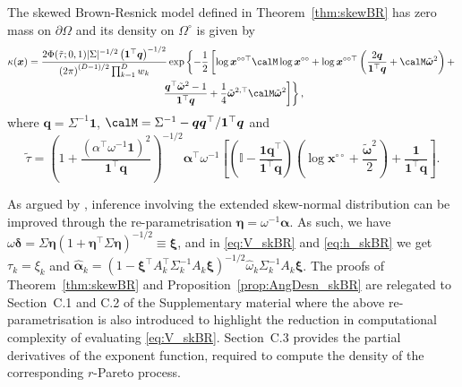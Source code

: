\documentclass[12pt]{article}
\begin{document}
\begin{proposition}
\label{prop:AngDesn_skBR}
The skewed Brown-Resnick model defined in Theorem~\ref{thm:skewBR} has zero mass on $\partial\Omega$ and its density on $\Omega^\circ$ is given by
%
\begin{multline}
\label{eq:h_skBR}
\kappa(\bm x) =\frac{2\Phi(\tilde{\tau};0,1)| \Sigma |^{-1/2} \left( \bm 1^\top \bm q\right)^{-1/2}}{\left( 2\pi \right)^{(D-1)/2}\prod_{k=1}^D w_k}\exp \left\{ -\frac{1}{2} \left[ \log \bm x^{\circ\circ\top} \calM \log \bm x^{\circ\circ} + \log \bm x^{\circ\circ\top} \left( \frac{2 \bm q}{\bm 1^\top \bm q} + \calM\tilde{\bm\omega}^2\right) + \right.\right. \\ 
\left.\left. \frac{\bm q^\top\tilde{\bm \omega}^2 - 1}{\bm 1 ^\top \bm q} + \frac{1}{4}\tilde{\bm\omega}^{2,\top}\calM\tilde{\bm\omega}^2 \right]\right\},
\end{multline}%
where $\bm q = \Sigma^{-1} \bm 1$, $\calM = \Sigma^{-1} - \bm q \bm q^\top / \bm 1^\top \bm q$ and  
$$\tilde{\tau}=\left(1 + \frac{\left(\alpha^\top\omega^{-1}\bm 1\right)^2}{\bm 1^\top \bm q} \right)^{-1/2} \bm\alpha^\top\omega^{-1}\left[\left(\mathbb{I} - \frac{\bm 1\bm q^\top}{\bm 1^\top \bm q}\right)\left(\log \bm x^{\circ\circ} + \frac{\tilde{\bm\omega}^2}{2}\right) +  \frac{\bm 1}{\bm 1^\top\bm q}  \right].$$
\end{proposition}

As argued by \citet[][Section~5.2]{Azzalini:2013}, inference involving the extended skew-normal distribution can be improved through the re-parametrisation $\bm \eta = \omega^{-1} \bm \alpha$. As such, we have $\omega \bm \delta = \Sigma \bm \eta \left( 1+\bm \eta^\top \Sigma \bm \eta\right)^{-1/2} \equiv \bm \xi$, and in \eqref{eq:V_skBR} and \eqref{eq:h_skBR} we get $\tau_k = \xi_k$ and $\hat{\bm\alpha}_k = \left(1-\bm\xi^\top A_k^\top\Sigma_k^{-1} A_k \bm\xi \right)^{-1/2} \hat{ \omega}_k\Sigma_k^{-1}A_k \bm\xi$. The proofs of Theorem~\ref{thm:skewBR} and Proposition~\ref{prop:AngDesn_skBR} are relegated to Section~C.1 and C.2 of the Supplementary material where the above re-parametrisation is also introduced to highlight the reduction in computational complexity of evaluating \eqref{eq:V_skBR}. Section~C.3 provides the partial derivatives of the exponent function, required to compute the density of the corresponding $r$-Pareto process. 
\end{document}
